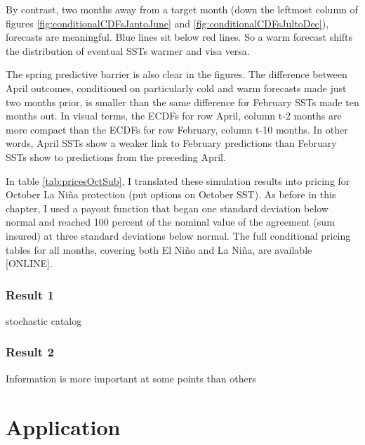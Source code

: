 \documentclass[authoryear]{article}
\begin{document}
By contrast, two months away from a target month (down the leftmost column of figures \ref{fig:conditionalCDFsJantoJune} and \ref{fig:conditionalCDFsJultoDec}), forecasts are meaningful. Blue lines sit below red lines. So a warm forecast shifts the distribution of eventual SSTs warmer and visa versa.

The spring predictive barrier is also clear in the figures. The difference between April outcomes, conditioned on particularly cold and warm forecasts made just two months prior, is smaller than the same difference for February SSTs made ten months out. In visual terms, the ECDFs for row April, column t-2 months are more compact than the ECDFs for row February, column t-10 months. In other words, April SSTs show a weaker link to February predictions than February SSTs show to predictions from the preceding April. 



In table \ref{tab:pricesOctSub}, I translated these simulation results into pricing for October La Ni\~na protection (put options on October SST). As before in this chapter, I used a payout function that began one standard deviation below normal and reached 100 percent of the nominal value of the agreement (sum insured) at three standard deviations below normal. The full conditional pricing tables for all months, covering both El Ni\~no and La Ni\~na, are available [ONLINE].


\subsubsection{Result 1} 
stochastic catalog

\subsubsection{Result 2}
Information is more important at some points than others



\section{Application}
\end{document}

